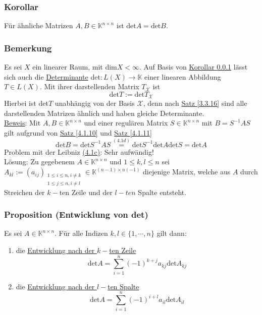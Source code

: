 \subsubsection{Korollar}
\label{4.1.12}
Für ähnliche Matrizen $A,B\in\mathbb{K}^{n\times n}$ ist det$A=$det$B$.
\subsubsection{Bemerkung}
Es sei $X$ ein linearer Raum, mit dim$X<\infty$.  Auf Basis von \hyperref[4.1.12]{Korollar \ref{4.1.12}} lässt sich auch die \underline{Determinante} det$:L(X)\rightarrow \mathbb{K}$ einer linearen Abbildung $T\in L(X)$.  Mit ihrer darstellenden Matrix $T_\mathcal{X}$ ist
\[\mathrm{det}T:=\mathrm{det}T_\mathcal{X}\]
Hierbei ist det$T$ unabhängig von der Basis $\mathcal{X}$, denn nach \hyperref[3.3.16]{Satz \ref{3.3.16}} sind alle darstellenden Matrizen ähnlich und haben gleiche Determinante.\\
\underline{Beweis}:  Mit $A,B\in\mathbb{K}^{n\times n}$ und einer regulären Matrix $S\in\mathbb{K}^{n\times n}$ mit $B=S^{-1}AS$ gilt aufgrund von \hyperref[4.1.10]{Satz \ref{4.1.10}} und \hyperref[4.1.11]{Satz \ref{4.1.11}}
\[\mathrm{det}B=\mathrm{det}S^{-1}AS\stackrel{\hyperref[4.1d]{(4.1d)}}{=}\mathrm{det}S^{-1}\mathrm{det}A\mathrm{det}S=\mathrm{det}A\]
Problem mit der Leibniz \hyperref[4.1c]{(4.1c)}: Sehr aufwändig!\\
Lösung: Zu gegebenem $A\in\mathbb{K}^{n\times n}$ und $1\leq k,l\leq n$ sei $A_{kl}:=(a_{ij})_{\substack{1\leq i\leq n, i\not=k\\ 1\leq j\leq n, i\not=l}}\in\mathbb{K}^{(n-1)\times n(-1)}$ diejenige Matrix, welche aus $A$ durch Streichen der $k-$ten Zeile und der $l-ten$ Spalte entsteht.
\subsubsection{Proposition (Entwicklung von det)}
\label{4.1.14}
Es sei $A\in\mathbb{K}^{n\times n}$.  Für alle Indizen $k,l\in\{1,\cdots ,n\}$ gilt dann:
\renewcommand{\labelenumi}{(\alph{enumi})}
\begin{enumerate}
\item die \underline{Entwicklung nach der $k-$ten Zeile}
\[\mathrm{det}A=\sum _{i=1}^n (-1)^{k+j}a_{kj}\mathrm{det}A_{kj}\]
\item die \underline{Entwicklung nach der $l-$ten Spalte}
\[\mathrm{det}A=\sum _{i=1}^n (-1)^{i+l}a_{il}\mathrm{det}A_{il}\]
\end{enumerate}
